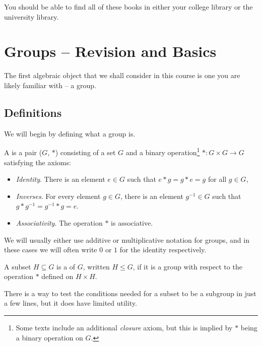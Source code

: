 \documentclass[a4paper]{scrreprt}
\begin{document}
You should be able to find all of these books in either your college library or the university library.


\clearpage


\chapter{Groups -- Revision and Basics}

The first algebraic object that we shall consider in this course is one you are likely familiar with -- a group. 

\section{Definitions}

We will begin by defining what a group is.

\begin{definition}[Group]
	A  is a pair ($G$, $*$) consisting of a set $G$ and a binary operation\footnote{Some texts include an additional \emph{closure} axiom, but this is implied by $*$ being a binary operation on $G$.} $* : G \times G \rightarrow G$ satisfying the axioms:
	\begin{itemize}
		\item \emph{Identity}. There is an element $e \in G$ such that $e * g = g * e = g$ for all $g \in G$,
		\item \emph{Inverses}. For every element $g \in G$, there is an element $g^{-1} \in G$ such that $g * g^{-1} = g^{-1} * g = e$.
		\item \emph{Associativity}. The operation $*$ is associative.
	\end{itemize}
\end{definition}

\begin{remark}
	We will usually either use additive or multiplicative notation for groups, and in these cases we will often write $0$ or $1$ for the identity respectively.
\end{remark}

\begin{definition}[Subgroup]
	A subset $H \subseteq G$ is a  of $G$, written $H \leq G$, if it is a group with respect to the operation $*$ defined on $H \times H$.
\end{definition}

There is a way to test the conditions needed for a subset to be a subgroup in just a few lines, but it does have limited utility.
\end{document}
